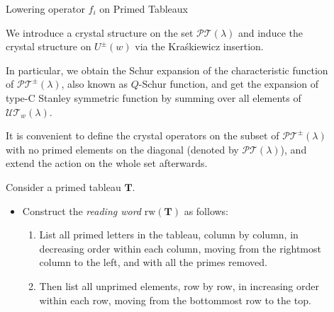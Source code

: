 \documentclass[final]{beamer}
\newcommand{\darkred}{\color{darkred}} %
\newcommand{\defn}[1]{\emph{\darkred #1}} %
\newlength{\sepwid}
\newlength{\onecolwid}
\newlength{\twocolwid}
\begin{document}
\begin{frame}[t]
\begin{columns}[t]
\begin{column}{\twocolwid}
\begin{columns}[t]
\begin{column}{\onecolwid}
\end{column} %

\end{columns}

\end{column}

\begin{column}{\sepwid}\end{column} %

\begin{column}{\onecolwid}\vspace{-.6in} %


\begin{block}{Lowering operator $f_i$ on Primed Tableaux}

We introduce a crystal structure on the set $\mathcal{PT}(\lambda)$ and induce the crystal structure on $U^\pm(w)$ via the Kra\'skiewicz insertion. 

In particular, we obtain the Schur expansion of the characteristic function of $\mathcal{PT}^\pm (\lambda)$, also known as $Q$-Schur function, and get the expansion of type-C Stanley symmetric function by summing over all elements of $\mathcal{UT}_w (\lambda)$.

It is convenient to define the crystal operators on the subset of $\mathcal{PT}^\pm (\lambda)$ with no primed elements on the diagonal (denoted by $\mathcal{PT} (\lambda)$), and extend the action on the whole set afterwards. 

Consider a primed tableau $\mathbf{T}$.

\begin{itemize}
\item Construct the \defn{reading word}  $\mathrm{rw}(\mathbf{T})$ as follows:

	\begin{enumerate}
	\item List all primed letters in the tableau, column by column, in decreasing order within each column, moving from the rightmost column to the left, and with all the primes removed.
	\item Then list all unprimed elements, row by row, in increasing order within each row, moving from the bottommost row to the top.
	\end{enumerate}


\end{itemize}
\end{block}
\end{column}
\end{columns}
\end{frame}
\end{document}
